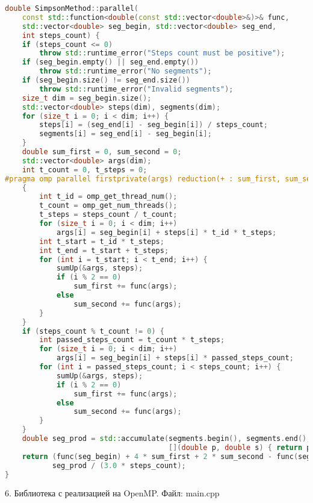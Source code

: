 \documentclass{report}
\begin{document}
\begin{lstlisting}[language=C++]
double SimpsonMethod::parallel(
    const std::function<double(const std::vector<double>&)>& func,
    std::vector<double> seg_begin, std::vector<double> seg_end,
    int steps_count) {
    if (steps_count <= 0)
        throw std::runtime_error("Steps count must be positive");
    if (seg_begin.empty() || seg_end.empty())
        throw std::runtime_error("No segments");
    if (seg_begin.size() != seg_end.size())
        throw std::runtime_error("Invalid segments");
    size_t dim = seg_begin.size();
    std::vector<double> steps(dim), segments(dim);
    for (size_t i = 0; i < dim; i++) {
        steps[i] = (seg_end[i] - seg_begin[i]) / steps_count;
        segments[i] = seg_end[i] - seg_begin[i];
    }
    double sum_first = 0, sum_second = 0;
    std::vector<double> args(dim);
    int t_count = 0, t_steps = 0;
#pragma omp parallel firstprivate(args) reduction(+ : sum_first, sum_second)
    {
        int t_id = omp_get_thread_num();
        t_count = omp_get_num_threads();
        t_steps = steps_count / t_count;
        for (size_t i = 0; i < dim; i++)
            args[i] = seg_begin[i] + steps[i] * t_id * t_steps;
        int t_start = t_id * t_steps;
        int t_end = t_start + t_steps;
        for (int i = t_start; i < t_end; i++) {
            sumUp(&args, steps);
            if (i % 2 == 0)
                sum_first += func(args);
            else
                sum_second += func(args);
        }
    }
    if (steps_count % t_count != 0) {
        int passed_steps_count = t_count * t_steps;
        for (size_t i = 0; i < dim; i++)
            args[i] = seg_begin[i] + steps[i] * passed_steps_count;
        for (int i = passed_steps_count; i < steps_count; i++) {
            sumUp(&args, steps);
            if (i % 2 == 0)
                sum_first += func(args);
            else
                sum_second += func(args);
        }
    }
    double seg_prod = std::accumulate(segments.begin(), segments.end(), 1.0,
                                      [](double p, double s) { return p * s; });
    return (func(seg_begin) + 4 * sum_first + 2 * sum_second - func(seg_end)) *
           seg_prod / (3.0 * steps_count);
}
\end{lstlisting}

\par 6. Библиотека с реализацией на OpenMP. Файл: main.cpp
\end{document}
